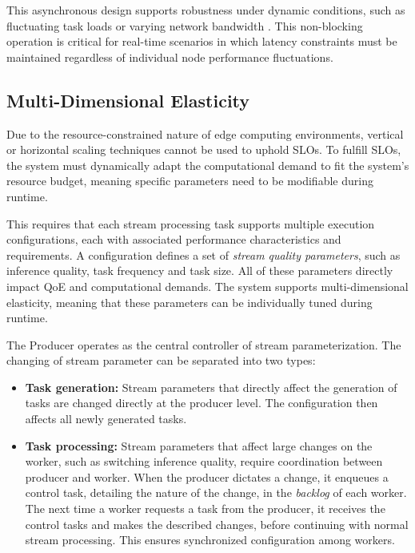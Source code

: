 This asynchronous design supports robustness under dynamic conditions, such as fluctuating task loads or varying network bandwidth \cite{nguyen_octopinf_2025}. This non-blocking operation is critical for real-time scenarios in which latency constraints must be maintained regardless of individual node performance fluctuations.


\subsection{Multi-Dimensional Elasticity}
Due to the resource-constrained nature of edge computing environments, vertical or horizontal scaling techniques cannot be used to uphold SLOs. To fulfill SLOs, the system must dynamically adapt the computational demand to fit the system's resource budget, meaning specific parameters need to be modifiable during runtime.

This requires that each stream processing task supports multiple execution configurations, each with associated performance characteristics and requirements. A configuration defines a set of \textit{stream quality parameters}, such as inference quality, task frequency and task size. All of these parameters directly impact QoE and computational demands. The system supports multi-dimensional elasticity, meaning that these parameters can be individually tuned during runtime.

The Producer operates as the central controller of stream parameterization. The changing of stream parameter can be separated into two types:

\begin{itemize}
    \item \textbf{Task generation:} Stream parameters that directly affect the generation of tasks are changed directly at the producer level. The configuration then affects all newly generated tasks.
    \item \textbf{Task processing:} Stream parameters that affect large changes on the worker, such as switching inference quality, require coordination between producer and worker. When the producer dictates a change, it enqueues a control task, detailing the nature of the change, in the \textit{backlog}\label{def:backlog} of each worker. The next time a worker requests a task from the producer, it receives the control tasks and makes the described changes, before continuing with normal stream processing. This ensures synchronized configuration among workers.
\end{itemize}

